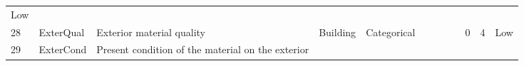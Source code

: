 \documentclass[11pt]{article}
\begin{document}
\begin{longtable}[]{@{}llllllllllll@{}}
\begin{minipage}[t]{0.04\columnwidth}
Low\strut
\end{minipage}\tabularnewline
\begin{minipage}[t]{0.04\columnwidth}\raggedright\strut
28\strut
\end{minipage} & \begin{minipage}[t]{0.04\columnwidth}\raggedright\strut
ExterQual\strut
\end{minipage} & \begin{minipage}[t]{0.04\columnwidth}\raggedright\strut
Exterior material quality\strut
\end{minipage} & \begin{minipage}[t]{0.04\columnwidth}\raggedright\strut
Building\strut
\end{minipage} & \begin{minipage}[t]{0.04\columnwidth}\raggedright\strut
Categorical\strut
\end{minipage} & \begin{minipage}[t]{0.04\columnwidth}\raggedright\strut
\strut
\end{minipage} & \begin{minipage}[t]{0.04\columnwidth}\raggedright\strut
\strut
\end{minipage} & \begin{minipage}[t]{0.04\columnwidth}\raggedright\strut
\strut
\end{minipage} & \begin{minipage}[t]{0.04\columnwidth}\raggedright\strut
\strut
\end{minipage} & \begin{minipage}[t]{0.04\columnwidth}\raggedright\strut
0\strut
\end{minipage} & \begin{minipage}[t]{0.04\columnwidth}\raggedright\strut
4\strut
\end{minipage} & \begin{minipage}[t]{0.04\columnwidth}\raggedright\strut
Low\strut
\end{minipage}\tabularnewline
\begin{minipage}[t]{0.04\columnwidth}\raggedright\strut
29\strut
\end{minipage} & \begin{minipage}[t]{0.04\columnwidth}\raggedright\strut
ExterCond\strut
\end{minipage} & \begin{minipage}[t]{0.04\columnwidth}\raggedright\strut
Present condition of the material on the exterior\strut
\end{minipage} & \begin{minipage}[t]{0.04\columnwidth}\raggedright\strut

\end{minipage}
\end{longtable}
\end{document}
